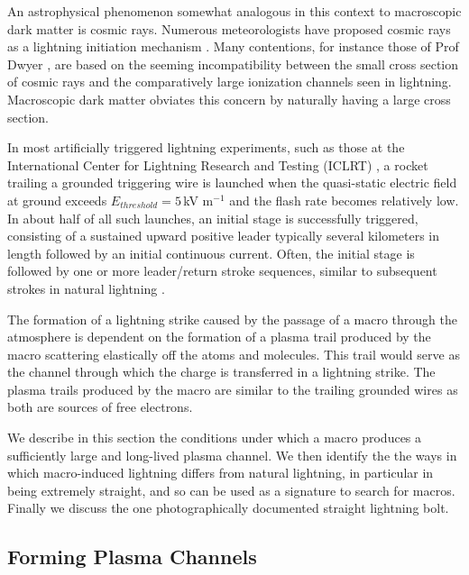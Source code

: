 \documentclass[%
 reprint,
 amsmath,amssymb,
 aps,
]{revtex4-2}
\newcommand{\vtwo}[1]{{\color{red} #1}}
\begin{document}
    \vtwo{An astrophysical phenomenon somewhat analogous in this context to macroscopic dark matter is cosmic rays. Numerous meteorologists have proposed cosmic rays as a lightning initiation mechanism \citep{Babich2012}. Many contentions, for instance those of Prof Dwyer \citep{scientific_american_2008}, are based on the seeming incompatibility between the small cross section of cosmic rays and the comparatively large ionization channels seen in lightning. Macroscopic dark matter obviates this concern by naturally having a large cross section.}

    In most artificially triggered lightning experiments, such as those at the International Center for Lightning Research and Testing (ICLRT) \vtwo{\citep{Hill2012, Hill2013}}, a rocket trailing a grounded triggering wire is launched when the quasi-static electric field at ground exceeds $E_{threshold} = 5\,$kV m$^{-1}$ and the flash rate becomes relatively low. In about half of all such launches, an initial stage is successfully triggered, consisting of a sustained upward positive leader typically several kilometers in length followed by an initial continuous current. Often, the initial stage is followed by one or more leader/return stroke sequences, similar to subsequent strokes in natural lightning \vtwo{\citep{Wang1999, rocket2012}}. 

    The formation of a lightning strike caused by the passage of a macro through the atmosphere is dependent on the formation of a plasma trail produced by the macro scattering elastically off the atoms and molecules. This trail would serve as the channel through which the charge is transferred in a lightning strike. The plasma trails produced by the macro are similar to the trailing grounded wires as both are sources of free electrons.

    We describe in this section the conditions under which a macro produces a sufficiently large and long-lived plasma channel. We then identify the the ways in which macro-induced lightning differs from natural lightning, in particular in being extremely straight, and so can be used as a signature to search for macros. Finally we discuss the one photographically documented straight lightning bolt.

    \subsection{Forming Plasma Channels} %
    \label{sub:macro_induced_plasma_channels}
\end{document}

